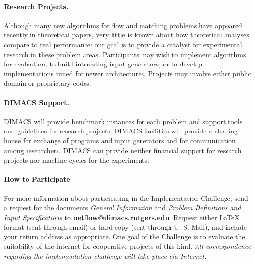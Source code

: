 \paragraph{Research Projects.} 
Although many new algorithms for flow and matching problems have appeared 
recently in theoretical papers, very little is known about how theoretical
analyses compare to real performance:  our goal is to provide a 
catalyst for experimental research in these problem areas.  
Participants may wish to implement algorithms for evaluation, to 
build interesting input generators, or to develop implementations
tuned for newer architectures.  Projects may involve either public domain
or proprietary codes. 

\paragraph{DIMACS Support.} 
DIMACS will provide benchmark instances for each problem and
support tools and guidelines for research projects.  DIMACS 
facilities will provide a clearing-house for exchange of 
programs and input generators and for communication among researchers.  
DIMACS can provide neither financial support for research projects nor 
machine cycles for the experiments.  

\paragraph{How to Participate} 

For more information about participating in the Implementation Challenge, 
send a request for the documents  {\em General Information} 
and {\em Problem Definitions and Input Specifications} to 
{\bf netflow@dimacs.rutgers.edu}.  Request either 
\LaTeX$\;$ format (sent through email) or hard copy 
(sent through U. S. Mail), and include your return address as 
appropriate.  One goal of the Challenge is to evaluate the 
suitability of the Internet
for cooperative projects of this kind. {\em All correspondence regarding
the implementation challenge will take place via Internet.} 


